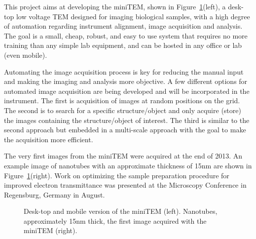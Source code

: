 \begin{enumerate}
{This project aims at developing the miniTEM, shown in Figure~\ref{fig:miniTEM}(left), a desk-top low voltage TEM designed for imaging biological samples, with a high degree of automation regarding instrument alignment, image acquisition and analysis. The goal is a small, cheap, robust, and easy to use system that requires no more training than any simple lab equipment, and can be hosted in any office or lab (even mobile).

Automating the image acquisition process is key for reducing the manual input and making the imaging and analysis more objective. A few different options for automated image acquisition are being developed and will be incorporated in the instrument. The first is acquisition of images at random positions on the grid. The second is to search for a specific structure/object and only acquire (store) the images containing the structure/object of interest. The third is similar to the second approach but embedded in a multi-scale approach with the goal to make the acquisition more efficient.

The very first images from the miniTEM were acquired at the end of 2013. An example image of nanotubes with an approximate thickness of 15nm are shown in Figure~\ref{fig:miniTEM}(right). Work on optimizing the sample preparation procedure for improved electron transmittance was presented at the Microscopy Conference in Regensburg, Germany in August.}

\begin{figure}[!h]
\centering
{}
\caption{Desk-top and mobile version of the miniTEM (left). Nanotubes, approximately 15nm thick, the first image acquired with the miniTEM (right).}
\label{fig:miniTEM}
\end{figure}


\end{enumerate}
